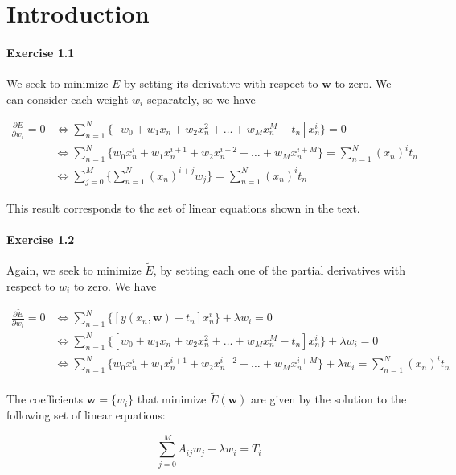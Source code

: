 \section{Introduction}

\paragraph{Exercise 1.1}

We seek to minimize $E$ by setting its derivative with respect to $\textbf{w}$
to zero. We can consider each weight $w_i$ separately, so we have

\begin{align*}
    \frac{\partial E}{\partial w_i} = 0 &\iff
    \sum_{n=1}^N \{[ w_0 + w_1x_n + w_2x_n^2 + \dots + w_Mx_n^M - t_n]x_n^i\} = 0\\
    &\iff \sum_{n=1}^N \{w_0x_n^i + w_1x_n^{i+1} + w_2x_n^{i+2} + \dots + w_Mx_n^{i+M}\} = \sum_{n=1}^{N} (x_n)^it_n\\
    &\iff \sum_{j=0}^M \{\sum_{n=1}^N (x_n)^{i + j} w_j\} = \sum_{n=1}^N (x_n)^it_n
\end{align*}

This result corresponds to the set of linear equations shown in the text.
    
\paragraph{Exercise 1.2}

Again, we seek to minimize $\tilde{E}$, by setting each one of the partial derivatives
with respect to $w_i$ to zero. We have

\begin{align*}
    \frac{\partial\tilde{E}}{\partial w_i} = 0 &\iff \sum_{n=1}^N \{[y(x_n, \textbf{w}) - t_n]x_n^i\} + \lambda w_i = 0\\
    &\iff \sum_{n=1}^N \{[w_0 + w_1x_n + w_2x_n^2 + \dots + w_Mx_n^M - t_n]x_n^i\} + \lambda w_i = 0\\
    &\iff \sum_{n=1}^N \{w_0x_n^i + w_1x_n^{i+1} + w_2x_n^{i+2} + \dots + w_Mx_n^{i+M}\} + \lambda w_i = \sum_{n=1}^N (x_n)^it_n\\
\end{align*}

The coefficients $\textbf{w} = \{w_i\}$ that minimize $\tilde{E}(\textbf{w})$ are given by the solution
to the following set of linear equations:

\begin{equation*}
    \sum_{j=0}^M A_{ij}w_j + \lambda w_i = T_i
\end{equation*}

